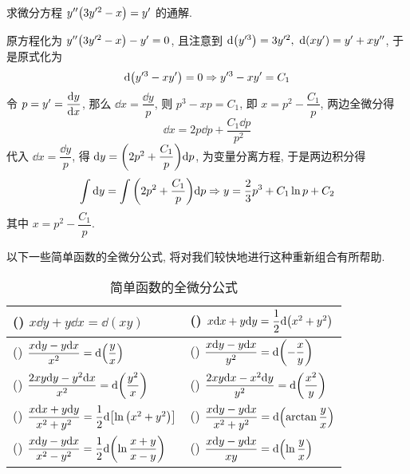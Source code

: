 \begin{example}
    求微分方程 $y''\qty(3y'^2-x)=y'$ 的通解.
\end{example}
\begin{solution}
    原方程化为 $y''\qty(3y'^2-x)-y'=0$, 且注意到 $\dd \qty(y'^3)=3y'^2,~\dd \qty(xy')=y'+xy''$, 于是原式化为
    $$\dd \qty(y'^3-xy')=0\Rightarrow y'^3-xy'=C_1$$
    令 $p=y'=\displaystyle\dv{y}{x}$, 那么 $\dd x=\dfrac{\dd y}{p}$, 则 $p^3-xp=C_1$, 即 $x=p^2-\dfrac{C_1}{p}$,
    两边全微分得 $$\dd x=2p\dd p+\dfrac{C_1\dd p}{p^2}$$
    代入 $\dd x=\dfrac{\dd y}{p}$, 得 $\dd y=\qty(2p^2+\dfrac{C_1}{p})\dd p$, 为变量分离方程, 于是两边积分得
    $$\int\dd y=\int\qty(2p^2+\dfrac{C_1}{p})\dd p\Rightarrow y=\dfrac{2}{3}p^3+C_1\ln p+C_2$$
    其中 $x=p^2-\dfrac{C_1}{p}.$
\end{solution}


以下一些简单函数的全微分公式, 将对我们较快地进行这种重新组合有所帮助.
\setcounter{magicrownumbers}{0}
\begin{table}[H]
    \centering
    \caption{简单函数的全微分公式}
    \begin{tabular}{l l}
        (\rownumber{}) $x\dd y+y\dd x=\dd (xy)$                                                   & (\rownumber{}) $x\dd x+y\dd y=\dfrac{1}{2}\dd \qty(x^2+y^2)$                 \\
        \midrule
        (\rownumber{}) $\dfrac{x\dd y-y\dd x}{x^2}=\dd \qty(\dfrac{y}{x})$                        & (\rownumber{}) $\dfrac{x\dd y-y\dd x}{y^2}=\dd \qty(-\dfrac{x}{y})$          \\
        (\rownumber{}) $\dfrac{2xy\dd y-y^2\dd x}{x^2}=\dd\qty(\dfrac{y^2}{x})$                   & (\rownumber{}) $\dfrac{2xy\dd x-x^2\dd y}{y^2}=\dd \qty(\dfrac{x^2}{y})$     \\
        \midrule
        (\rownumber{}) $\dfrac{x\dd x+y\dd y}{x^2+y^2}=\dfrac{1}{2}\dd \qty[\ln\qty(x^2+y^2)]$    & (\rownumber{}) $\dfrac{x\dd y-y\dd x}{x^2+y^2}=\dd\qty(\arctan\dfrac{y}{x})$ \\
        (\rownumber{}) $\dfrac{x\dd y-y\dd x}{x^2-y^2}=\dfrac{1}{2}\dd \qty(\ln\dfrac{x+y}{x-y})$ & (\rownumber{}) $\dfrac{x\dd y-y\dd x}{xy}=\dd \qty(\ln\dfrac{y}{x})$         \\
    \end{tabular}
\end{table}

